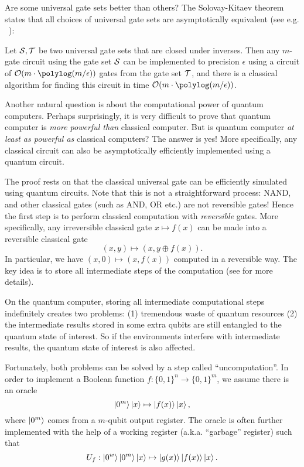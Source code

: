 Are some universal gate sets better than others? The Solovay-Kitaev theorem states that all choices of universal gate sets are asymptotically equivalent (see e.g. ~\cite[Chapter 2]{ChildsQuantumLec}):
\begin{thm}
  Let $\mathcal{S},\mathcal{T}$ be two universal gate sets that are closed under
  inverses. Then any $m$-gate circuit using the gate set $\mathcal{S}$ can be implemented to
  precision $\epsilon$ using a circuit of $\Or(m\cdot \polylog(m/\epsilon))$ gates from the gate set $\mathcal{T}$, 
  and there is a classical algorithm for finding this circuit in time $\Or(m\cdot \polylog(m/\epsilon))$.
  \label{thm:solovay_kitaev}
\end{thm}


Another natural question is about the computational power of quantum computers. 
Perhaps surprisingly, it is very difficult to prove that quantum computer is \emph{more powerful than} classical computer. 
But is quantum computer \emph{at least as powerful as} classical computers? 
The answer is yes! 
More specifically, any classical circuit can also be  asymptotically efficiently implemented using a quantum circuit.

The proof rests on that the classical universal gate can be efficiently simulated using quantum circuits. 
Note that this is not a straightforward process: NAND, and other classical gates (such as AND, OR etc.) are not reversible gates!
Hence the first step is to perform classical computation with \emph{reversible} gates.
More specifically, any irreversible classical gate $x\mapsto f(x)$ can be made into a reversible classical gate
\begin{equation}
(x,y)\mapsto (x,y\oplus f(x)).
\label{eqn:reversible_classical}
\end{equation}
In particular, we have $(x,0)\mapsto (x,f(x))$ computed in a reversible way. The key idea is to store all intermediate steps of the computation (see \cite[Section 3.2.5]{NielsenChuang2000} for more details).

On the quantum computer, storing all intermediate computational steps indefinitely creates two problems: (1) tremendous waste of quantum resources (2) the intermediate results stored in some extra qubits are still entangled to the quantum state of interest. So if the environments interfere with intermediate results, the quantum state of interest is also affected.

Fortunately, both problems can be solved by a step called ``uncomputation''. In order to implement a Boolean function
\(f :\{0,1\}^{n} \rightarrow\{0,1\}^{m}\), we assume there is an oracle
\begin{equation}\ket{0^m}\ket{x}\mapsto \ket{f(x)}\ket{x},\end{equation}
where \(\ket{0^m}\) comes from a \(m\)-qubit output register. The oracle
is often further implemented with the help of a working register (a.k.a.
``garbage'' register) such that
\begin{equation}
U_f:\ket{0^{w}}\ket{0^m}\ket{x}\mapsto \ket{g(x)}\ket{f(x)}\ket{x}.
\end{equation}

